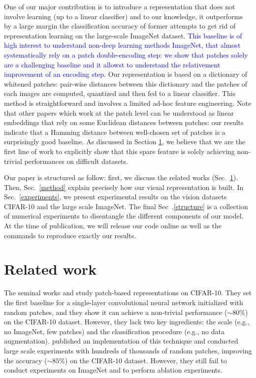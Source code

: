 \documentclass{article}
\newcommand{\Edouard}[1]{\textcolor{blue}{#1}}
\begin{document}
One of our major contribution is to introduce a representation that does not involve learning (up to a linear classifier) and to our knowledge, it outperforms by a large margin the classification accuracy of former attempts to get rid of representation learning on the large-scale ImageNet dataset. \Edouard{This baseline is of high interest to understand non-deep learning methods ImageNet, that almost systematically rely on a patch double-encoding step: we show that patches solely are a challenging baseline and it allowst to understand the relativement improvement of an encoding step.} Our representation is based on a dictionary of whitened patches: pair-wise distances between this dictionary and the patches of each images are computed, quantized and then fed to a linear classifier. This method is  straightforward and involves a limited ad-hoc feature engineering. Note that other papers which work at the patch level can be understood as linear embeddings that rely on some Euclidean distances between patches: our results indicate that a Hamming distance between well-chosen set of patches is a surprisingly good baseline. As discussed in Section \ref{related_work}, we believe that we are the first line of work to explicitly show that this  spare feature is solely achieving non-trivial performances on difficult datasets.

Our paper is structured as follow: first, we discuss the related works (Sec.~\ref{related_work}). Then, Sec.~\ref{method} explain precisely how our visual representation is built. In Sec.~\ref{experiments}, we present experimental results on the vision datasets CIFAR-10 and the large scale  ImageNet. The final Sec~.\ref{structure} is a collection of numerical experiments to disentangle the different components of our model. At the time of publication, we will release our code online as well as the commands to reproduce exactly our results.


\section{Related work}
\label{related_work}

The seminal works \cite{coates2011analysis} and \cite{coates2011importance}  study patch-based representations on CIFAR-10.
They set the first baseline for a single-layer convolutional neural network initialized with random patches, and they show it  can achieve a non-trivial performance ($\sim 80 \%$) on the CIFAR-10 dataset. However, they lack two key ingredients: the scale (e.g., no ImageNet, few patches) and the classification procedure (e.g., no data augmentation).
 \cite{recht2019imagenet} published an implementation of this technique and conducted large scale experiments with hundreds of thousands of random patches, improving the accuracy ($\sim 85 \%$) on the CIFAR-10 dataset.
However, they still fail to conduct experiments on ImageNet and to perform  ablation experiments.
\end{document}
